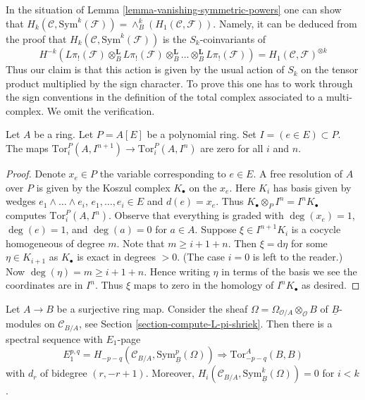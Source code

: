 \begin{remark}
\label{remark-first-homology-symmetric-power}
In the situation of Lemma \ref{lemma-vanishing-symmetric-powers}
one can show that
$H_k(\mathcal{C}, \text{Sym}^k(\mathcal{F})) =
\wedge^k_B(H_1(\mathcal{C}, \mathcal{F}))$.
Namely, it can be deduced from the proof that
$H_k(\mathcal{C}, \text{Sym}^k(\mathcal{F}))$ is the $S_k$-coinvariants
of
$$
H^{-k}(L\pi_!(\mathcal{F}) \otimes_B^\mathbf{L}
L\pi_!(\mathcal{F}) \otimes_B^\mathbf{L}
\ldots \otimes_B^\mathbf{L} L\pi_!(\mathcal{F})) =
H_1(\mathcal{C}, \mathcal{F})^{\otimes k}
$$
Thus our claim is that this action is given by the usual action
of $S_k$ on the tensor product multiplied by the sign character.
To prove this one has to work through the sign conventions
in the definition of the total complex associated to a
multi-complex. We omit the verification.
\end{remark}

\begin{lemma}
\label{lemma-map-tors-zero}
Let $A$ be a ring. Let $P = A[E]$ be a polynomial ring.
Set $I = (e \in E) \subset P$. The maps
$\text{Tor}_i^P(A, I^{n + 1}) \to \text{Tor}_i^P(A, I^n)$
are zero for all $i$ and $n$.
\end{lemma}

\begin{proof}
Denote $x_e \in P$ the variable corresponding to $e \in E$.
A free resolution of $A$ over $P$ is given by the Koszul complex
$K_\bullet$ on the $x_e$. Here $K_i$ has basis given by wedges
$e_1 \wedge \ldots \wedge e_i$, $e_1, \ldots, e_i \in E$ and $d(e) = x_e$.
Thus $K_\bullet \otimes_P I^n = I^nK_\bullet$ computes
$\text{Tor}_i^P(A, I^n)$. Observe that everything is graded
with $\deg(x_e) = 1$, $\deg(e) = 1$, and $\deg(a) = 0$ for $a \in A$.
Suppose $\xi \in I^{n + 1}K_i$ is a cocycle homogeneous of degree $m$.
Note that $m \geq i + 1 + n$. Then $\xi = \text{d}\eta$ for some
$\eta \in K_{i + 1}$ as $K_\bullet$ is exact in degrees $ > 0$.
(The case $i = 0$ is left to the reader.)
Now $\deg(\eta) = m \geq i + 1 + n$. Hence writing $\eta$
in terms of the basis we see the coordinates are in $I^n$.
Thus $\xi$ maps to zero in the homology of $I^nK_\bullet$ as desired.
\end{proof}

\begin{theorem}
\label{theorem-quillen-spectral-sequence}
Let $A \to B$ be a surjective ring map. Consider the sheaf
$\Omega = \Omega_{\mathcal{O}/A} \otimes_\mathcal{O} B$ of
$\underline{B}$-modules on $\mathcal{C}_{B/A}$, see
Section \ref{section-compute-L-pi-shriek}.
Then there is a spectral sequence with $E_1$-page
$$
E_1^{p, q} =
H_{- p - q}(\mathcal{C}_{B/A}, \text{Sym}^p_{\underline{B}}(\Omega))
\Rightarrow \text{Tor}^A_{- p - q}(B, B)
$$
with $d_r$ of bidegree $(r, -r + 1)$.
Moreover, $H_i(\mathcal{C}_{B/A}, \text{Sym}^k_{\underline{B}}(\Omega)) = 0$
for $i < k$.
\end{theorem}

